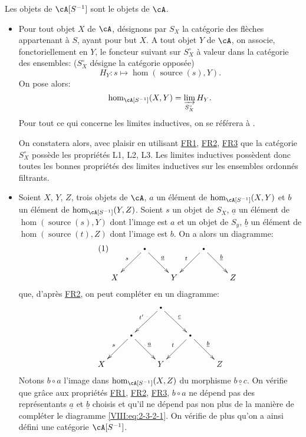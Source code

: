 \subsubsection{}\label{VIII:2-3-2}

Les objets de $\cA[S^{-1}]$ sont le objets de $\cA$. 
\begin{itemize}
  \item Pour tout objet $X$ de $\cA$, désignons par $S_X$ la catégorie des 
    flèches appartenant à $S$, ayant pour but $X$. A tout objet $Y$ de 
    $\cA$, on associe, fonctoriellement en $Y$, le foncteur suivant sur 
    $S_X^\circ$ à valeur dans la catégorie des ensembles: 
    ($S_X^\circ$ désigne la catégorie opposée) 
    \[
      H_Y:s\mapsto \hom(\operatorname{source}(s),Y) \text{.}
    \]
    On pose alors: 
    \[
      \hom_{\cA[S^{-1}]}(X,Y) = \varinjlim_{S_X^\circ} H_Y \text{.}
    \]
    Pour tout ce qui concerne les limites inductives, on se référera à 
    \cite{ar62}. 
    
    On constatera alors, avec plaisir en utilisant \hyperref[VIII:FR1]{FR1}, 
    \hyperref[VIII:FR2]{FR2}, \hyperref[VIII:FR3]{FR3} que la catégorie 
    $S_X^\circ$ possède les propriétés L1, L2, L3. Les limites inductives 
    possèdent donc toutes les bonnes propriétés des limites inductives 
    sur les ensembles ordonnés filtrants. 
  \item Soient $X$, $Y$, $Z$, trois objets de $\cA$, $a$ un élément de 
    $\hom_{\cA[S^{-1}]}(X,Y)$ et $b$ un élément de 
    $\hom_{\cA[S^{-1}]}(Y,Z)$. Soient $s$ un objet de $S_X$, $\underline a$ un 
    élément de $\hom(\operatorname{source}(s),Y)$ dont l'image est $a$ et 
    un objet de $S_y$, $\underline b$ un élément de 
    $\hom(\operatorname{source}(t),Z)$ dont l'image est $b$. On a alors un 
    diagramme: 
    \begin{equation*}\tag{1}\label{VIII:eq:2-3-2-1}
    \xymatrix{
      & \bullet \ar[dl]_-s \ar[dr]^-{\underline a} 
        & 
        & \bullet \ar[dl]_-t \ar[dr]^-{\underline b} \\
      X 
        & 
        & Y 
        & 
        & Z 
    }
    \end{equation*}
    que, d'après \hyperref[VIII:FR2]{FR2}, on peut compléter en un 
    diagramme: 
    \[\xymatrix{
      & & \bullet \ar[dl]_-{t'} \ar[dr]^-{\underline c} \\
      & \bullet \ar[dl]_-s \ar[dr]^-{\underline a} 
        & & \bullet \ar[dl]_-t \ar[dr]^-{\underline b} \\
      X 
        & & Y 
        & & Z 
    }\]
    Notons $b\circ a$ l'image dans $\hom_{\cA[S^{-1}]}(X,Z)$ du morphisme 
    $\underline{b\circ c}$. On vérifie que gr\^ace aux propriétés 
    \hyperref[VIII:FR1]{FR1}, \hyperref[VIII:FR2]{FR2}, 
    \hyperref[VIII:FR3]{FR3}, $b\circ a$ ne dépend pas des représentants 
    $\underline a$ et $\underline b$ choisis et qu'il ne dépend pas non plus 
    de la manière de compléter le diagramme \eqref{VIII:eq:2-3-2-1}. On 
    vérifie de plus qu'on a ainsi défini une catégorie $\cA[S^{-1}]$. 
\end{itemize}

